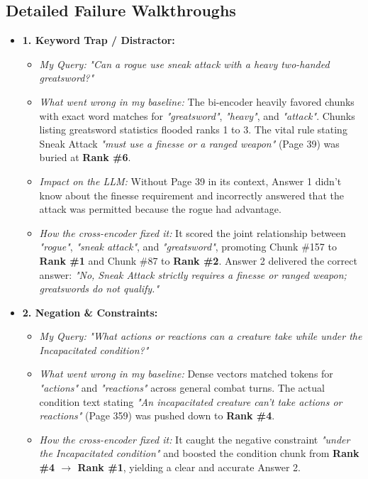 \documentclass[10pt,a4paper]{article}
\begin{document}
\vspace{-2pt}
\subsection{Detailed Failure Walkthroughs}
\begin{itemize}[leftmargin=1.4em, itemsep=2pt, topsep=1pt]
  \item \textbf{1. Keyword Trap / Distractor:}
  \begin{itemize}[leftmargin=1.2em, itemsep=1pt]
    \item \textit{My Query:} \textit{"Can a rogue use sneak attack with a heavy two-handed greatsword?"}
    \item \textit{What went wrong in my baseline:} The bi-encoder heavily favored chunks with exact word matches for \textit{"greatsword"}, \textit{"heavy"}, and \textit{"attack"}. Chunks listing greatsword statistics flooded ranks 1 to 3. The vital rule stating Sneak Attack \textit{"must use a finesse or a ranged weapon"} (Page 39) was buried at \textbf{Rank \#6}.
    \item \textit{Impact on the LLM:} Without Page 39 in its context, Answer 1 didn't know about the finesse requirement and incorrectly answered that the attack was permitted because the rogue had advantage.
    \item \textit{How the cross-encoder fixed it:} It scored the joint relationship between \textit{"rogue"}, \textit{"sneak attack"}, and \textit{"greatsword"}, promoting Chunk \#157 to \textbf{Rank \#1} and Chunk \#87 to \textbf{Rank \#2}. Answer 2 delivered the correct answer: \textit{"No, Sneak Attack strictly requires a finesse or ranged weapon; greatswords do not qualify."}
  \end{itemize}

  \item \textbf{2. Negation \& Constraints:}
  \begin{itemize}[leftmargin=1.2em, itemsep=1pt]
    \item \textit{My Query:} \textit{"What actions or reactions can a creature take while under the Incapacitated condition?"}
    \item \textit{What went wrong in my baseline:} Dense vectors matched tokens for \textit{"actions"} and \textit{"reactions"} across general combat turns. The actual condition text stating \textit{"An incapacitated creature can't take actions or reactions"} (Page 359) was pushed down to \textbf{Rank \#4}.
    \item \textit{How the cross-encoder fixed it:} It caught the negative constraint \textit{"under the Incapacitated condition"} and boosted the condition chunk from \textbf{Rank \#4 $\rightarrow$ Rank \#1}, yielding a clear and accurate Answer 2.
  \end{itemize}


\end{itemize}
\end{document}

